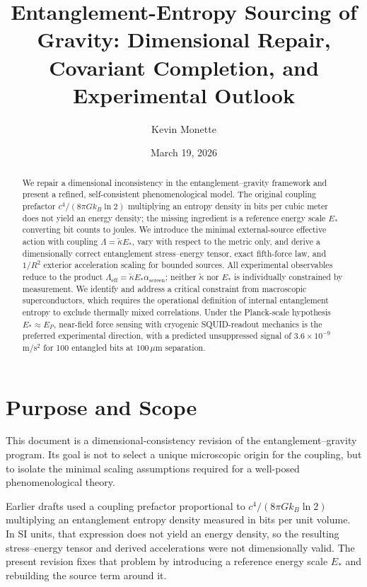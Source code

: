 \documentclass[11pt]{article}
\title{Entanglement-Entropy Sourcing of Gravity: Dimensional Repair,\\Covariant Completion, and Experimental Outlook}
\author{Kevin Monette}
\date{March 19, 2026}
\begin{document}
\maketitle

\begin{abstract}
We repair a dimensional inconsistency in the entanglement--gravity framework and present a refined, self-consistent phenomenological model. The original coupling prefactor $c^4/(8\pi Gk_B\ln 2)$ multiplying an entropy density in bits per cubic meter does not yield an energy density; the missing ingredient is a reference energy scale $E_*$ converting bit counts to joules. We introduce the minimal external-source effective action with coupling $\Lambda = \tilde{\kappa}E_*$, vary with respect to the metric only, and derive a dimensionally correct entanglement stress--energy tensor, exact fifth-force law, and $1/R^2$ exterior acceleration scaling for bounded sources. All experimental observables reduce to the product $\Lambda_{\mathrm{eff}} = \tilde{\kappa}E_*\alpha_{\mathrm{screen}}$; neither $\tilde{\kappa}$ nor $E_*$ is individually constrained by measurement. We identify and address a critical constraint from macroscopic superconductors, which requires the operational definition of internal entanglement entropy to exclude thermally mixed correlations. Under the Planck-scale hypothesis $E_* \approx E_P$, near-field force sensing with cryogenic SQUID-readout mechanics is the preferred experimental direction, with a predicted unsuppressed signal of $3.6\times10^{-9}$\,m/s$^2$ for 100 entangled bits at $100\,\mu$m separation.
\end{abstract}

\section{Purpose and Scope}

This document is a dimensional-consistency revision of the entanglement--gravity program. Its goal is not to select a unique microscopic origin for the coupling, but to isolate the minimal scaling assumptions required for a well-posed phenomenological theory.

Earlier drafts used a coupling prefactor proportional to $c^4/(8\pi G k_B \ln 2)$ multiplying an entanglement entropy density measured in bits per unit volume. In SI units, that expression does not yield an energy density, so the resulting stress--energy tensor and derived accelerations were not dimensionally valid. The present revision fixes that problem by introducing a reference energy scale $E_*$ and rebuilding the source term around it.
\end{document}
